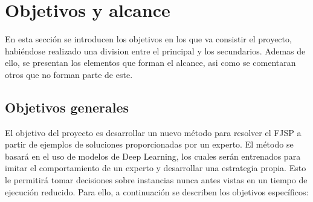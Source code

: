 \section{Objetivos y alcance}
En esta sección se introducen los objetivos en los que va consistir el proyecto, habiéndose
realizado una division entre el principal y los secundarios. Ademas de ello, se presentan 
los elementos que forman el alcance, asi como se comentaran otros que no forman parte de este.  

\subsection{Objetivos generales}
El objetivo del proyecto es desarrollar un nuevo método para resolver el FJSP 
a partir de ejemplos de soluciones proporcionadas por un experto. El método se basará en
el uso de modelos de Deep Learning, los cuales serán entrenados para imitar el comportamiento
de un experto y desarrollar una estrategia propia. Esto le permitirá tomar decisiones 
sobre instancias nunca antes vistas en un tiempo de ejecución reducido. 
Para ello, a continuación se describen los objetivos específicos:

